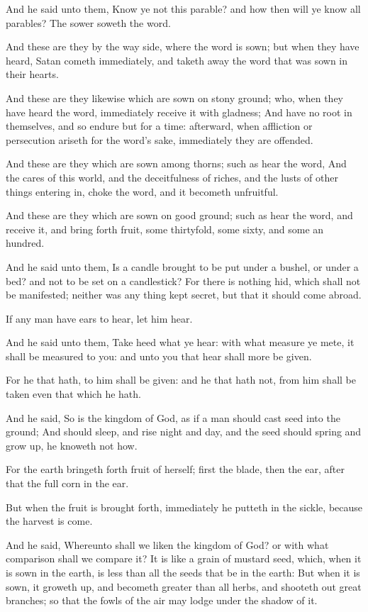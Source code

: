 \verse And he said unto them, Know ye not this parable? and how then will ye know all parables?  \verse The sower soweth the word.

\verse And these are they by the way side, where the word is sown; but when they have heard, Satan cometh immediately, and taketh away the word that was sown in their hearts.

\verse And these are they likewise which are sown on stony ground; who, when they have heard the word, immediately receive it with gladness; \verse And have no root in themselves, and so endure but for a time: afterward, when affliction or persecution ariseth for the word's sake, immediately they are offended.

\verse And these are they which are sown among thorns; such as hear the word, \verse And the cares of this world, and the deceitfulness of riches, and the lusts of other things entering in, choke the word, and it becometh unfruitful.

\verse And these are they which are sown on good ground; such as hear the word, and receive it, and bring forth fruit, some thirtyfold, some sixty, and some an hundred.

\verse And he said unto them, Is a candle brought to be put under a bushel, or under a bed? and not to be set on a candlestick?  \verse For there is nothing hid, which shall not be manifested; neither was any thing kept secret, but that it should come abroad.

\verse If any man have ears to hear, let him hear.

\verse And he said unto them, Take heed what ye hear: with what measure ye mete, it shall be measured to you: and unto you that hear shall more be given.

\verse For he that hath, to him shall be given: and he that hath not, from him shall be taken even that which he hath.

\verse And he said, So is the kingdom of God, as if a man should cast seed into the ground; \verse And should sleep, and rise night and day, and the seed should spring and grow up, he knoweth not how.

\verse For the earth bringeth forth fruit of herself; first the blade, then the ear, after that the full corn in the ear.

\verse But when the fruit is brought forth, immediately he putteth in the sickle, because the harvest is come.

\verse And he said, Whereunto shall we liken the kingdom of God? or with what comparison shall we compare it?  \verse It is like a grain of mustard seed, which, when it is sown in the earth, is less than all the seeds that be in the earth: \verse But when it is sown, it groweth up, and becometh greater than all herbs, and shooteth out great branches; so that the fowls of the air may lodge under the shadow of it.

